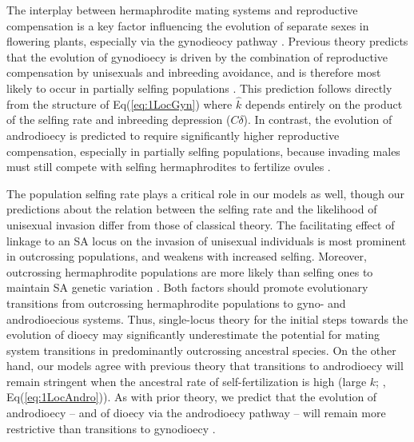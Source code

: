 \documentclass{article}
\begin{document}
The interplay between hermaphrodite mating systems and reproductive compensation is a key factor influencing the evolution of separate sexes in flowering plants, especially via the gynodieocy pathway \citep{Darwin1877,Charlesworth1978a}. Previous theory predicts that the evolution of gynodioecy is driven by the combination of reproductive compensation by unisexuals and inbreeding avoidance, and is therefore most likely to occur in partially selfing populations \citep{Lewis1942,Lloyd1975,Charlesworth1978a,KaferPannell2017}. This prediction follows directly from the structure of Eq(\ref{eq:1LocGyn}) where $\hat{k}$ depends entirely on the product of the selfing rate and inbreeding depression ($C \delta$). In contrast, the evolution of androdioecy is predicted to require significantly higher reproductive compensation, especially in partially selfing populations, because invading males must still compete with selfing hermaphrodites to fertilize ovules \citep{Charlesworth1978b, KaferPannell2017}. 

The population selfing rate plays a critical role in our models as well, though our predictions about the relation between the selfing rate and the likelihood of unisexual invasion differ from those of classical theory. The facilitating effect of linkage to an SA locus on the invasion of unisexual individuals is most prominent in outcrossing populations, and weakens with increased selfing. Moreover, outcrossing hermaphrodite populations are more likely than selfing ones to maintain SA genetic variation \citep{JordanConnallon2014,Olito2016}. Both factors should promote evolutionary transitions from outcrossing hermaphrodite populations to gyno- and androdioecious systems. Thus, single-locus theory for the initial steps towards the evolution of dioecy may significantly underestimate the potential for mating system transitions in predominantly outcrossing ancestral species. On the other hand, our models agree with previous theory that transitions to androdioecy will remain stringent when the ancestral rate of self-fertilization is high (large $k$; \citealt{Charlesworth1978a}, Eq(\ref{eq:1LocAndro})). As with prior theory, we predict that the evolution of androdioecy -- and of dioecy via the androdioecy pathway -- will remain more restrictive than transitions to gynodioecy \citep{Charlesworth1978a, Charlesworth2006, KaferPannell2017, Renner2014}.
\end{document}
